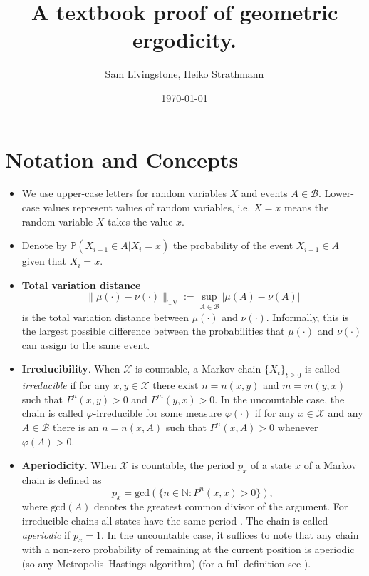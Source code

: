 \documentclass{article}
\title{\Large \bfseries A textbook proof of geometric ergodicity.}
\author{Sam Livingstone, Heiko Strathmann}
\date{\today}
\newcommand{\ch}[1]{ \{#1_t\}_{t \geq 0} }
\newcommand{\X}{\mathcal{X}}
\newcommand{\B}{\mathcal{B}}
\newcommand{\TV}{\text{TV}}
\begin{document}
\maketitle

\listoftodos

\section{Notation and Concepts}

\begin{itemize}
\item We use upper-case letters for random variables $X$ and events $A\in \mathcal{B}$. Lower-case values represent values of random variables, i.e. $X=x$ means the random variable $X$ takes the value $x$.
\item Denote by $\mathbb{P}(X_{i+1} \in A |X_i = x)$ the probability of the event $X_{i+1} \in A$ given that $X_i = x$.
\item \textbf{Total variation distance}
\begin{equation*}
\|\mu(\cdot) - \nu(\cdot)\|_{\TV} := \sup_{A \in \mathcal{B}} |\mu(A) - \nu(A)|
\end{equation*}
is the total variation distance between $\mu(\cdot)$ and $\nu(\cdot)$. Informally, this is the largest possible difference between the probabilities that $\mu(\cdot)$ and $\nu(\cdot)$ can assign to the same event.
\item \textbf{Irreducibility}. When $\X$ is countable, a Markov chain $\ch{X}$ is called \emph{irreducible} if for any $x,y \in \X$ there exist $n = n(x,y)$ and $m = m(y,x)$ such that $P^n(x,y)>0$ and $P^m(y,x) > 0$.  In the uncountable case, the chain is called $\varphi$-irreducible for some measure $\varphi(\cdot)$ if for any $x \in \X$ and any $A \in \B$ there is an $n = n(x,A)$ such that $P^n(x,A) > 0$ whenever $\varphi(A) > 0$.
\item \textbf{Aperiodicity}. When $\X$ is countable, the period $p_x$ of a state $x$ of a Markov chain is defined as
\[
p_x = \text{gcd}(\{ n \in \mathbb{N} : P^n(x,x) > 0 \}),
\]
where $\text{gcd}(A)$ denotes the greatest common divisor of the argument.  For irreducible chains all states have the same period \cite{norris1997markov}.  The chain is called \emph{aperiodic} if $p_x = 1$.  In the uncountable case, it suffices to note that any chain with a non-zero probability of remaining at the current position is aperiodic (so any Metropolis--Hastings algorithm) (for a full definition see \cite{tierney1994markov}).

\end{itemize}
\end{document}
